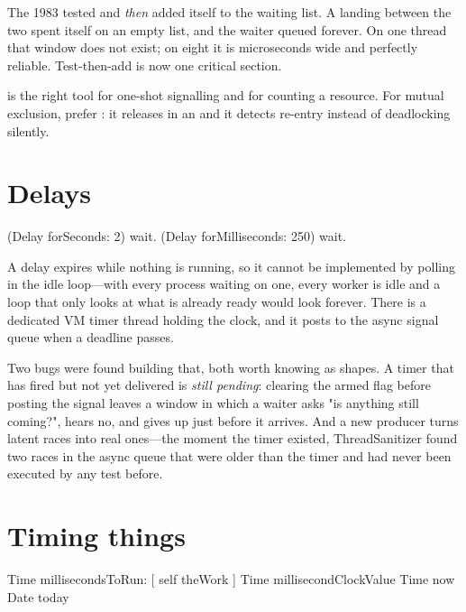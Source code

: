 \begin{stnote}
The 1983  tested  and \emph{then} added itself to
the waiting list. A  landing between the two spent itself on an
empty list, and the waiter queued forever. On one thread that window does not
exist; on eight it is microseconds wide and perfectly reliable. Test-then-add
is now one critical section.
\end{stnote}

 is the right tool for one-shot signalling and for counting a
resource. For mutual exclusion, prefer : it releases in an
 and it detects re-entry instead of deadlocking silently.

\section{Delays}

\begin{st}
(Delay forSeconds: 2) wait.
(Delay forMilliseconds: 250) wait.
\end{st}

A delay expires while nothing is running, so it cannot be implemented by
polling in the idle loop---with every process waiting on one, every worker is
idle and a loop that only looks at what is already ready would look forever.
There is a dedicated VM timer thread holding the clock, and it posts to the
async signal queue when a deadline passes.

\begin{stnote}
Two bugs were found building that, both worth knowing as shapes. A timer that
has fired but not yet delivered is \emph{still pending}: clearing the armed
flag before posting the signal leaves a window in which a waiter asks "is
anything still coming?", hears no, and gives up just before it arrives. And a
new producer turns latent races into real ones---the moment the timer existed,
ThreadSanitizer found two races in the async queue that were older than the
timer and had never been executed by any test before.
\end{stnote}

\section{Timing things}

\begin{st}
Time millisecondsToRun: [ self theWork ]
Time millisecondClockValue
Time now
Date today
\end{st}

